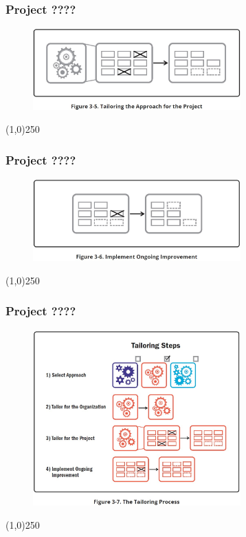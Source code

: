 \begin{frame}
\frametitle{Project ????}
 \begin{figure}
    \centering
        \includegraphics[width = 8cm]{../images/guide/Fig3-5.jpg}
    \label{guidefig:3-5}
 \end{figure}
\end{frame}
\begin{center}\line(1,0){250}\end{center}

\begin{frame}
\frametitle{Project ????}
 \begin{figure}
    \centering
        \includegraphics[width = 8cm]{../images/guide/Fig3-6.jpg}
    \label{guidefig:3-6}
 \end{figure}
\end{frame}
\begin{center}\line(1,0){250}\end{center}

\begin{frame}
\frametitle{Project ????}
 \begin{figure}
    \centering
        \includegraphics[width = 8cm]{../images/guide/Fig3-7.jpg}
    \label{guidefig:3-7}
 \end{figure}
\end{frame}
\begin{center}\line(1,0){250}\end{center}



